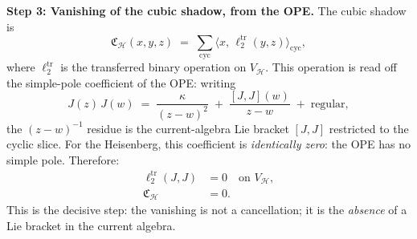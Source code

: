\begin{computation}
\medskip
\noindent\textbf{Step 3: Vanishing of the cubic shadow, from the
 OPE.}
The cubic shadow is
\begin{equation}\label{eq:heisenberg-cubic-formula}
 \mathfrak{C}_{\mathcal{H}}(x,y,z)
 \;=\; \sum_{\mathrm{cyc}} \bigl\langle x,\,
 \ell_2^{\mathrm{tr}}(y,z) \bigr\rangle_{\mathrm{cyc}},
\end{equation}
where $\ell_2^{\mathrm{tr}}$ is the transferred binary operation on
$V_{\mathcal{H}}$. This operation is read off the simple-pole
coefficient of the OPE: writing
\begin{equation}\label{eq:ope-simple-pole-extraction}
 J(z)\,J(w)
 \;=\;
 \frac{\kappa}{(z-w)^2}
 \;+\;
 \frac{[J,J](w)}{z-w}
 \;+\; \text{regular},
\end{equation}
the $(z-w)^{-1}$ residue is the current-algebra Lie bracket
$[J,J]$ restricted to the cyclic slice. For the Heisenberg, this
coefficient is \emph{identically zero}: the OPE has no simple
pole. Therefore:
\begin{align}\label{eq:heisenberg-ell2-vanishing}
 \ell_2^{\mathrm{tr}}(J,J) &= 0
 \quad\text{on } V_{\mathcal{H}},\\
 \label{eq:heisenberg-cubic-vanishing}
 \mathfrak{C}_{\mathcal{H}} &= 0.
\end{align}
This is the decisive step: the vanishing is not a
cancellation; it is the \emph{absence} of a Lie bracket in the
current algebra.


\end{computation}
